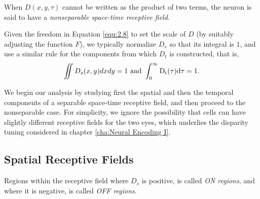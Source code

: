 \begin{defn}
  \label{def:nonseparableReceptiveField}
  When $D(x,y,\tau)$ cannot be written as the product of two terms, the neuron is said to have a \emph{nonseparable space-time receptive field}.
\end{defn}

\begin{asm}[Normalization]
  \label{asm:Normalized}
  Given the freedom in Equation \ref{equ:2.8} to set the scale of $D$ (by suitably adjusting the function $F$), we typically normalize $D_s$ so that its integral is $1$, and use a similar rule for the components from which $D_t$ is constructed, that is,
  \begin{displaymath}
    \iint D_s(x,y)dxdy = 1 \ \rm{and} \ \int_0^{\infty}D_t(\tau)d\tau = 1.
  \end{displaymath}
\end{asm}

\begin{rem}
  We begin our analysis by studying first the spatial and then the temporal components of a separable space-time receptive field, and then proceed to the nonseparable case. For simplicity, we ignore the possibility that cells can have slightly different receptive fields for the two eyes, which underlies the disparity tuning considered in chapter \ref{cha:Neural Encoding I}.
\end{rem}

\subsection{Spatial Receptive Fields}
\label{sec:SpatialReceptiveFields}

\begin{defn}
  \label{def:regions}
  Regions within the receptive field where $D_s$ is positive, is called \emph{ON regions}, and where it is negative, is called \emph{OFF regions}.
\end{defn}

